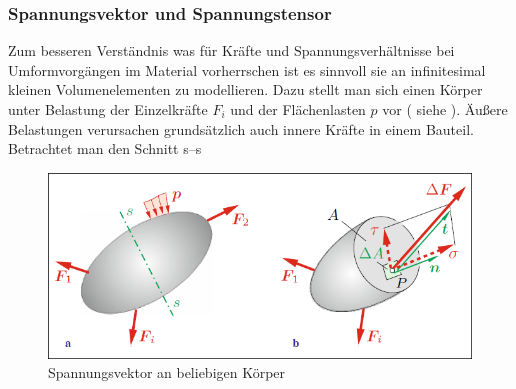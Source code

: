 \documentclass[12pt,a4paper,parskip,twoside,BCOR5mm,headsepline]{scrartcl}
\begin{document}
\begin{description*}
\subsubsection{Spannungsvektor und Spannungstensor}
Zum besseren Verständnis was für Kräfte und Spannungsverhältnisse bei Umformvorgängen im Material vorherrschen ist es sinnvoll sie an infinitesimal kleinen Volumenelementen zu modellieren. Dazu stellt man sich einen Körper unter Belastung der Einzelkräfte $ F_i $ und der Flächenlasten $ p $  vor ( siehe ). Äußere Belastungen verursachen grundsätzlich auch innere Kräfte in einem Bauteil. Betrachtet man den Schnitt s--s \begin{figure}
  \centering
  \includegraphics[width=.8\textwidth]{normalvektor}
  \caption[Spannungsvektor am Körper]{Spannungsvektor an beliebigen Körper \autocite[43]{tmr}}
  \label{fig:normalvektor}
  \end{figure}


\end{description*}
\end{document}
